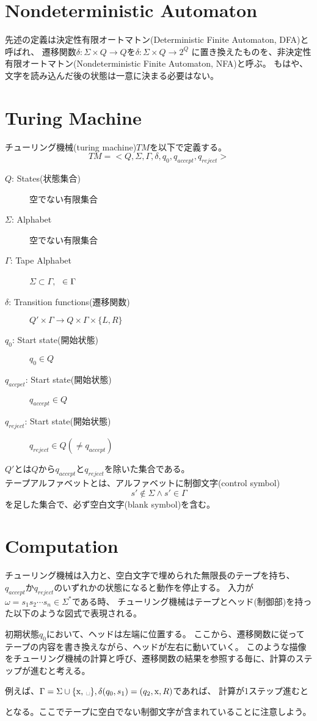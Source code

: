 \documentclass[b5paper,fleqn]{ltjsarticle}
\begin{document}
\section{Nondeterministic Automaton}
先述の定義は決定性有限オートマトン(Deterministic Finite Automaton, DFA)と呼ばれ、
遷移関数$\delta:\Sigma\times Q\rightarrow Q$を$\delta:\Sigma\times Q\rightarrow 2^Q$
に置き換えたものを、非決定性有限オートマトン(Nondeterministic Finite Automaton, NFA)と呼ぶ。
もはや、文字を読み込んだ後の状態は一意に決まる必要はない。

\newpage
\section{Turing Machine}
チューリング機械(turing machine)$TM$を以下で定義する。
\[TM=<Q,\Sigma,\Gamma,\delta,q_0,q_{accept},q_{reject}>\]
\begin{description}
\item[$Q$: States(状態集合)] 空でない有限集合
\item[$\Sigma$: Alphabet] 空でない有限集合
\item[$\Gamma$: Tape Alphabet] $\Sigma\subset\Gamma,$ \textvisiblespace$\hskip3pt\in\Gamma$
\item[$\delta$: Transition functions(遷移関数)] $Q'\times\Gamma\rightarrow Q\times\Gamma\times\{L,R\}$
\item[$q_0$: Start state(開始状態)] $q_0\in Q$
\item[$q_{accpet}$: Start state(開始状態)] $q_{accept}\in Q$
\item[$q_{reject}$: Start state(開始状態)] $q_{reject}\in Q (\neq q_{accept})$
\end{description}
$Q'$とは$Q$から$q_{accept}$と$q_{reject}$を除いた集合である。\\
テープアルファベットとは、アルファベットに制御文字(control symbol)
\[s'\notin\Sigma\land s'\in\Gamma\]
を足した集合で、必ず空白文字(blank symbol)\textvisiblespace を含む。
\section{Computation}
チューリング機械は入力と、空白文字で埋められた無限長のテープを持ち、
$q_{accept}$か$q_{reject}$のいずれかの状態になると動作を停止する。
入力が$\omega=s_1s_2\cdots s_n\in\Sigma^*$である時、
チューリング機械はテープとヘッド(制御部)を持った以下のような図式で表現される。

初期状態$q_0$において、ヘッドは左端に位置する。
ここから、遷移関数に従ってテープの内容を書き換えながら、ヘッドが左右に動いていく。
このような描像をチューリング機械の計算と呼び、遷移関数の結果を参照する毎に、計算のステップが進むと考える。\par
例えば、$\Gamma=\Sigma\cup\{\text{x, \textvisiblespace}\}, \delta(q_0,s_1)=(q_2,\text{x},R)$であれば、
計算が1ステップ進むと

となる。ここでテープに空白でない制御文字が含まれていることに注意しよう。
\end{document}
